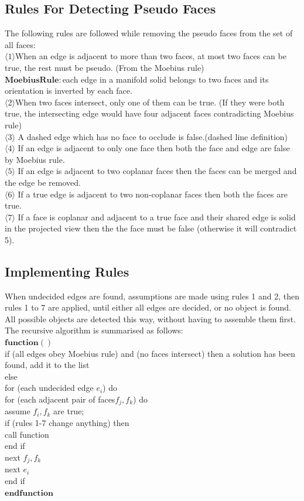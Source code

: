 \documentclass{article}
\begin{document}
\subsection{Rules For Detecting Pseudo Faces}
The following rules are followed while removing the pseudo faces from the set of all faces:
\\$\langle 1\rangle$When an edge is adjacent to more than two
faces, at most two faces can be true, the rest
must be pseudo. (From the Moebius rule)
\\$\mathbf{Moebius Rule:}$each edge in a manifold solid belongs to two faces and its orientation is inverted by each face.
\\$\langle 2\rangle$When two faces intersect, only one of them can
be true. (If they were both true, the intersecting
edge would have four adjacent faces contradicting Moebius rule)
\\$\langle 3 \rangle $ A dashed edge which has no face to occlude is false.(dashed line definition)
\\$\langle 4 \rangle$ If an edge is adjacent to only one face then both the face and edge are false by Moebius rule.
\\$\langle 5 \rangle$ If an edge is adjacent to two coplanar faces then the faces can be merged and the edge be removed.
\\$\langle 6 \rangle $ If a true edge is adjacent to two non-coplanar faces then both the faces are true.
\\$\langle 7 \rangle $ If a face is coplanar and adjacent to a true face and their shared edge is solid in the projected view then the the face must be false (otherwise it will contradict 5).
\subsection{Implementing Rules}
When undecided edges are found, assumptions are
made using rules 1 and 2, then rules 1 to 7 are
applied, until either all edges are decided, or no
object is found. All possible objects are detected this
way, without having to assemble them first. The
recursive algorithm is summarised as follows:
\\$\mathbf{function()}$
\\if (all edges obey Moebius rule)
and (no faces intersect) then
a solution has been found, add it to the list
\\else
\\for (each undecided edge $e_i$) do
\\for (each adjacent pair of faces$f_j ,f_k$) do
\\assume $f_i,f_k$ are true;
\\if (rules 1-7 change anything) then
\\call function
\\end if
\\next $f_j,f_k$
\\next $e_i$
\\end if
\\$\mathbf{end function}$
\end{document}

